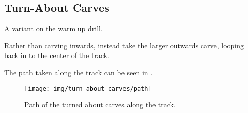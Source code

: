 \subsection*{Turn-About Carves}

A variant on the warm up drill.

Rather than carving inwards, instead take the larger outwards carve, looping back in to the center of the track. 

The path taken along the track can be seen in . 

\begin{figure*}
\centering
\texttt{[image: img/turn\_about\_carves/path]}
\caption{Path of the turned about carves along the track. \label{fig:sticky/carves/turn_about}}
\end{figure*}
